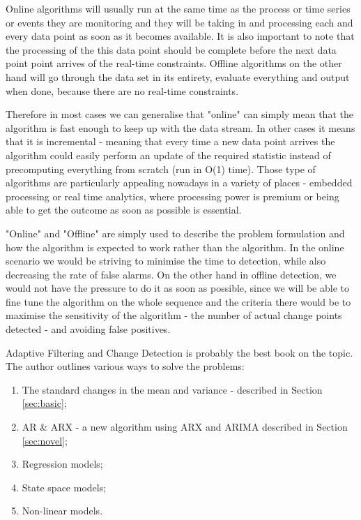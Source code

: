 \documentclass[minf,twoside,singlespacing,parskip,notimes,deptreport]{infthesis} %
\begin{document}
Online algorithms will usually run at the same time as the process or time series or events they are monitoring and they will be taking in and processing each and every data point as soon as it becomes available. It is also important to note that the processing of the this data point should be complete before the next data point point arrives of the real-time constraints. Offline algorithms on the other hand will go through the data set in its entirety, evaluate everything and output when done, because there are no real-time constraints.

Therefore in most cases we can generalise that "online" can simply mean that the algorithm is fast enough to keep up with the data stream. In other cases it means that it is incremental - meaning that every time a new data point arrives the algorithm could easily perform an update of the required statistic instead of precomputing everything from scratch (run in O(1) time). Those type of algorithms are particularly appealing nowadays in a variety of places - embedded processing or real time analytics, where processing power is  premium or being able to get the outcome as soon as possible is essential. 

"Online" and "Offline" are simply used to describe the problem formulation and how the algorithm is expected to work rather than the algorithm. In the online scenario we would be striving to minimise the time to detection, while also decreasing the rate of false alarms. On the other hand in offline detection, we would not have the pressure to do it as soon as possible, since we will be able to fine tune the algorithm on the whole sequence and the criteria there would be to maximise the sensitivity of the algorithm - the number of actual change points detected - and avoiding false positives.

Adaptive Filtering and Change Detection\cite{Gustaf}  is probably the best book on the topic. The author outlines various ways to solve the problems:
\begin{enumerate}
\item The standard changes in the mean and variance - described in Section \ref{sec:basic};
\item AR \& ARX - a new algorithm using ARX and ARIMA described in Section \ref{sec:novel};
\item Regression models;
\item State space models;
\item Non-linear models.
\end{enumerate}
\end{document}
